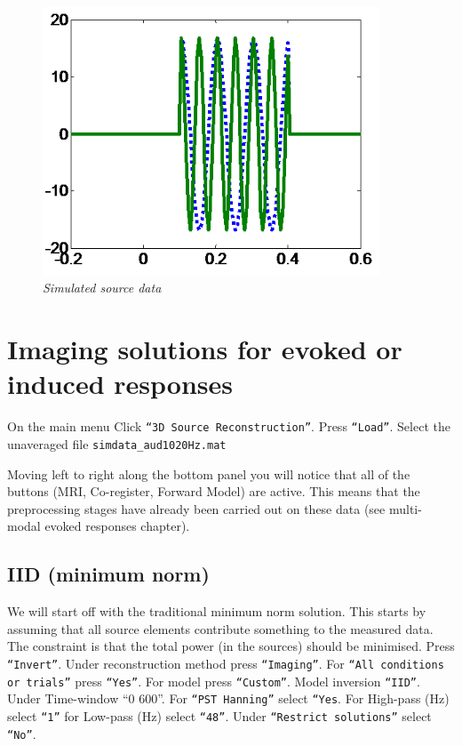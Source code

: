 \begin{figure}
\begin{center}
\includegraphics[width=100mm]{meg_sloc/slide1}
\caption{\em Simulated source data \label{meg_sloc:fig:1}}
\end{center}
\end{figure}


\section{Imaging solutions for evoked or induced responses}

On the main menu Click \texttt{``3D Source Reconstruction''}. Press \texttt{``Load''}. Select the unaveraged file \texttt{simdata\_aud1020Hz.mat}

Moving left to right along the bottom panel you will notice that all of the buttons (MRI, Co-register, Forward Model) are active. This means that the preprocessing stages have already been carried out on these data (see multi-modal evoked responses chapter).

\subsection{IID (minimum norm)}
We will start off with the traditional minimum norm solution. This starts by assuming that all source elements contribute something to the measured data. The constraint is that the total power (in the sources) should be minimised.
Press \texttt{``Invert''}. Under reconstruction method press \texttt{``Imaging''}. For \texttt{``All conditions or trials''} press \texttt{``Yes''}. For model press \texttt{``Custom''}. Model inversion \texttt{``IID''}. Under Time-window ``0 600''. For \texttt{``PST Hanning''} select \texttt{``Yes}. For High-pass (Hz) select \texttt{``1''} for Low-pass (Hz) select \texttt{``48''}. Under \texttt{``Restrict solutions''} select \texttt{``No''}. 

